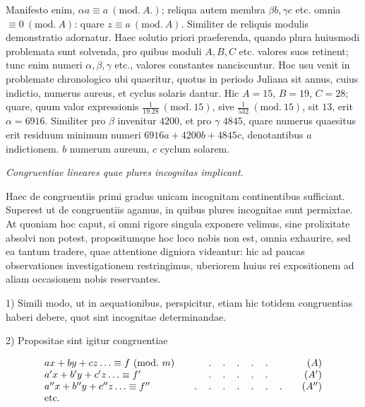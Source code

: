 Manifesto enim, $\alpha a\equiv a\ (\mathrm{mod.}\ A.)$; reliqua autem membra
$\beta b,\gamma c$ etc. omnia $\equiv 0\ (\mathrm{mod.}\ A)$: quare
$z\equiv a\ (\mathrm{mod.}\ A)$. Similiter de reliquis modulis demonstratio adornatur.
Haec solutio priori praeferenda, quando plura huiusmodi problemata sunt solvenda, pro
quibus moduli $A,B,C$ etc. valores suos retinent; tunc enim numeri $\alpha,\beta,\gamma$
etc., valores constantes nanciscuntur. Hoc usu venit in problemate chronologico ubi
quaeritur, quotus in periodo Juliana sit annus, cuius indictio, numerus aureus, et
cyclus solaris dantur. Hic $A=15$, $B=19$, $C=28$; quare,
quum valor expressionis $\frac{1}{19.28}\ (\mathrm{mod.}\ 15)$, sive $\frac{1}{532}\ (\mathrm{mod.}\ 15)$, sit $13$, erit $\alpha=6916$. Similiter pro $\beta$ invenitur $4200$, et pro $\gamma$ $4845$, quare numerus quaesitus erit residuum minimum numeri $6916a+4200b+4845c$, denotantibus $a$ indictionem. $b$ numerum aureum, $c$ cyclum solarem.

\begin{center}\emph{Congruentiae lineares quae plures incognitas implicant.}\end{center}


Haec de congruentiis primi gradus unicam incognitam continentibus sufficiant. Superest ut de congruentiis agamus, in quibus plures incognitae sunt permixtae. At quoniam hoc caput, si omni rigore singula exponere velimus, sine prolixitate absolvi non potest, propositumque hoc loco nobis non est, omnia exhaurire, sed ea tantum tradere, quae attentione digniora videantur: hic ad paucas observationes investigationem restringimus, uberiorem huius rei expositionem ad aliam occasionem nobis reservantes.

1) Simili modo, ut in aequationibus, perspicitur, etiam hic totidem congruentias haberi debere, quot sint incognitae determinandae.

2) Propositae sint igitur congruentiae

\[
\begin{array}{l@{\qquad}c@{\qquad}r}
ax+by+cz\ldots\equiv f\ (\mathrm{mod.}\ m)&\ldotp\quad\ldotp\quad\ldotp\quad\ldotp\quad\ldotp&(A)\\
a'x+b'y+c'z\ldots\equiv f'&\ldotp\quad\ldotp\quad\ldotp\quad\ldotp\quad\ldotp&(A')\\
a''x+b''y+c''z\ldots\equiv f''&\ldotp\quad\ldotp\quad\ldotp\quad\ldotp\quad\ldotp\quad\ldotp\quad\ldotp&(A'')\\
\mathrm{etc.}&&
\end{array}
\]

